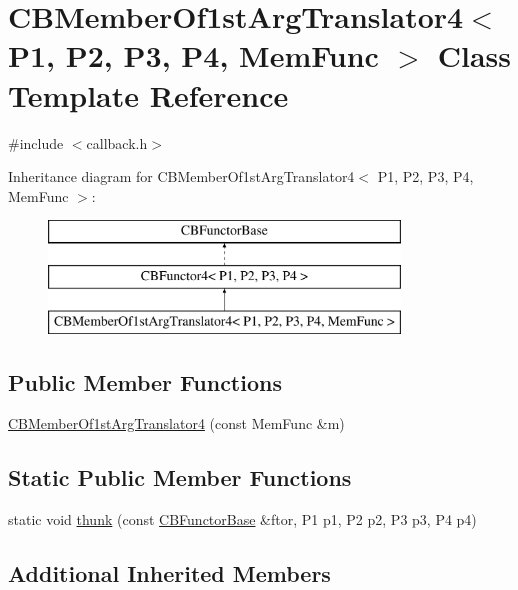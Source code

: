 \hypertarget{class_c_b_member_of1st_arg_translator4}{\section{C\+B\+Member\+Of1st\+Arg\+Translator4$<$ P1, P2, P3, P4, Mem\+Func $>$ Class Template Reference}
\label{class_c_b_member_of1st_arg_translator4}
}


{\ttfamily \#include $<$callback.\+h$>$}

Inheritance diagram for C\+B\+Member\+Of1st\+Arg\+Translator4$<$ P1, P2, P3, P4, Mem\+Func $>$\+:\begin{figure}[H]
\begin{center}
\leavevmode
\includegraphics[height=3.000000cm]{class_c_b_member_of1st_arg_translator4}
\end{center}
\end{figure}
\subsection*{Public Member Functions}
\begin{DoxyCompactItemize}
\item 
\hyperlink{class_c_b_member_of1st_arg_translator4_aaa496d239ea6144915739368a8007e3b}{C\+B\+Member\+Of1st\+Arg\+Translator4} (const Mem\+Func \&m)
\end{DoxyCompactItemize}
\subsection*{Static Public Member Functions}
\begin{DoxyCompactItemize}
\item 
static void \hyperlink{class_c_b_member_of1st_arg_translator4_a6403ce84fe0adc0ffbd602c8d697a8b1}{thunk} (const \hyperlink{class_c_b_functor_base}{C\+B\+Functor\+Base} \&ftor, P1 p1, P2 p2, P3 p3, P4 p4)
\end{DoxyCompactItemize}
\subsection*{Additional Inherited Members}


